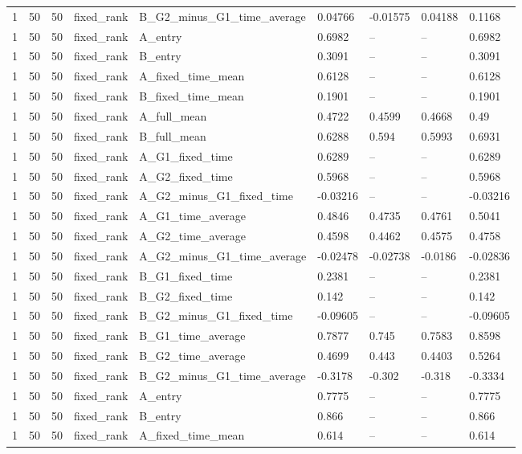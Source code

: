 \begin{longtable}{lllllllll}
1 & 50 & 50 & fixed\_rank & B\_G2\_minus\_G1\_time\_average & 0.04766 & -0.01575 & 0.04188 & 0.1168 \\
1 & 50 & 50 & fixed\_rank & A\_entry & 0.6982 & -- & -- & 0.6982 \\
1 & 50 & 50 & fixed\_rank & B\_entry & 0.3091 & -- & -- & 0.3091 \\
1 & 50 & 50 & fixed\_rank & A\_fixed\_time\_mean & 0.6128 & -- & -- & 0.6128 \\
1 & 50 & 50 & fixed\_rank & B\_fixed\_time\_mean & 0.1901 & -- & -- & 0.1901 \\
1 & 50 & 50 & fixed\_rank & A\_full\_mean & 0.4722 & 0.4599 & 0.4668 & 0.49 \\
1 & 50 & 50 & fixed\_rank & B\_full\_mean & 0.6288 & 0.594 & 0.5993 & 0.6931 \\
1 & 50 & 50 & fixed\_rank & A\_G1\_fixed\_time & 0.6289 & -- & -- & 0.6289 \\
1 & 50 & 50 & fixed\_rank & A\_G2\_fixed\_time & 0.5968 & -- & -- & 0.5968 \\
1 & 50 & 50 & fixed\_rank & A\_G2\_minus\_G1\_fixed\_time & -0.03216 & -- & -- & -0.03216 \\
1 & 50 & 50 & fixed\_rank & A\_G1\_time\_average & 0.4846 & 0.4735 & 0.4761 & 0.5041 \\
1 & 50 & 50 & fixed\_rank & A\_G2\_time\_average & 0.4598 & 0.4462 & 0.4575 & 0.4758 \\
1 & 50 & 50 & fixed\_rank & A\_G2\_minus\_G1\_time\_average & -0.02478 & -0.02738 & -0.0186 & -0.02836 \\
1 & 50 & 50 & fixed\_rank & B\_G1\_fixed\_time & 0.2381 & -- & -- & 0.2381 \\
1 & 50 & 50 & fixed\_rank & B\_G2\_fixed\_time & 0.142 & -- & -- & 0.142 \\
1 & 50 & 50 & fixed\_rank & B\_G2\_minus\_G1\_fixed\_time & -0.09605 & -- & -- & -0.09605 \\
1 & 50 & 50 & fixed\_rank & B\_G1\_time\_average & 0.7877 & 0.745 & 0.7583 & 0.8598 \\
1 & 50 & 50 & fixed\_rank & B\_G2\_time\_average & 0.4699 & 0.443 & 0.4403 & 0.5264 \\
1 & 50 & 50 & fixed\_rank & B\_G2\_minus\_G1\_time\_average & -0.3178 & -0.302 & -0.318 & -0.3334 \\
1 & 50 & 50 & fixed\_rank & A\_entry & 0.7775 & -- & -- & 0.7775 \\
1 & 50 & 50 & fixed\_rank & B\_entry & 0.866 & -- & -- & 0.866 \\
1 & 50 & 50 & fixed\_rank & A\_fixed\_time\_mean & 0.614 & -- & -- & 0.614 \\

\end{longtable}
